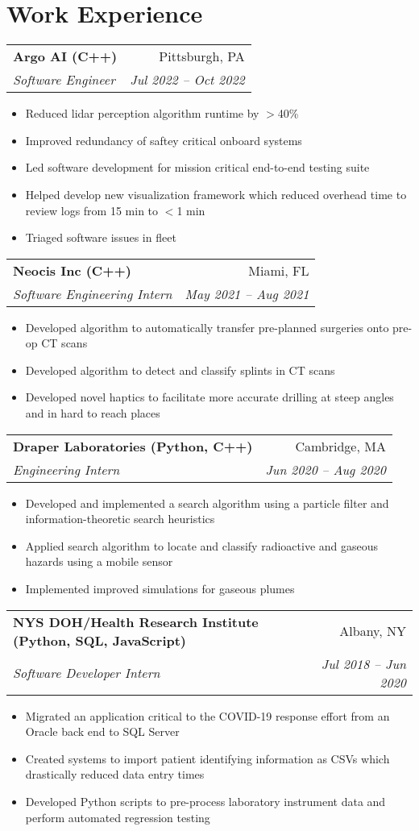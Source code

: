 \documentclass[letterpaper,11pt]{article}
\makeatletter
\newcommand{\resumeItem}[2]{
  \item\small{
    \textbf{#1}{#2 \vspace{-5pt}}
  }
}
\newcommand{\resumeSubheading}[4]{
    \vspace{3pt} 
    \begin{tabular*}{0.97\textwidth}{l@{\extracolsep{\fill}}r}
      \textbf{#1} & #2 \\
      \textit{\small#3} & \textit{\small #4} \\
    \end{tabular*}\vspace{-3pt}
}
\newcommand{\resumeSubHeadingListStart}{}
\newcommand{\resumeSubHeadingListEnd}{}
\newcommand{\resumeItemListStart}{\begin{itemize}}
\newcommand{\resumeItemListEnd}{\end{itemize}}
\makeatother
\begin{document}
\section{Work Experience}
  \resumeSubHeadingListStart
  \resumeSubheading{Argo AI (C++)}{Pittsburgh, PA}
    {Software Engineer}{Jul 2022 -- Oct 2022}
      \resumeItemListStart
        \resumeItem{}
      {Reduced lidar perception algorithm runtime by $>$40\%}
        \resumeItem{}
      {Improved redundancy of saftey critical onboard systems}
        \resumeItem{}
      {Led software development for mission critical end-to-end testing suite}
        \resumeItem{}
      {Helped develop new visualization framework which reduced overhead time to review logs from 15 min to $<$1 min}
        \resumeItem{}
      {Triaged software issues in fleet}
      \resumeItemListEnd
  \resumeSubheading{Neocis Inc (C++)}{Miami, FL}
    {Software Engineering Intern}{May 2021 -- Aug 2021}
      \resumeItemListStart
        \resumeItem{}
      {Developed algorithm to automatically transfer pre-planned surgeries onto pre-op CT scans}
        \resumeItem{}
      {Developed algorithm to detect and classify splints in CT scans}
        \resumeItem{}
      {Developed novel haptics to facilitate more accurate drilling at steep angles and in hard to reach places}
      \resumeItemListEnd
  \resumeSubheading{Draper Laboratories (Python, C++)}
    {Cambridge, MA}{Engineering Intern}{Jun 2020 -- Aug 2020}
      \resumeItemListStart
        \resumeItem{}
        {Developed and implemented a search algorithm using a particle filter and information-theoretic search heuristics}
        \resumeItem{}
        {Applied search algorithm to locate and classify radioactive and gaseous hazards using a mobile sensor} 
        \resumeItem{}
        {Implemented improved simulations for gaseous plumes}
      \resumeItemListEnd
      \resumeSubheading{NYS DOH/Health Research Institute (Python, SQL, JavaScript)}
    {Albany, NY}{Software Developer Intern}{Jul 2018 -- Jun 2020}
      \resumeItemListStart
        \resumeItem{}
        {Migrated an application critical to the COVID-19 response effort from an Oracle back end to SQL Server}
        \resumeItem{}
        {Created systems to import patient identifying information as CSVs which drastically reduced data entry times}
        \resumeItem{}
        {Developed Python scripts to pre-process laboratory instrument data and perform automated regression testing}
      \resumeItemListEnd
  \resumeSubHeadingListEnd
\end{document}
